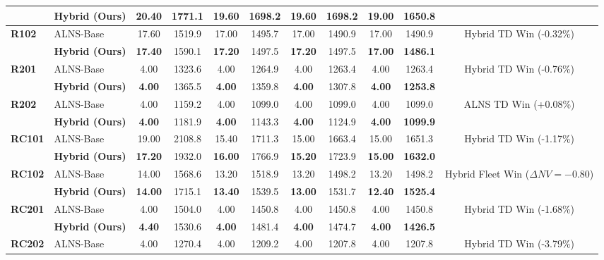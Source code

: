 \begin{table}[!htbp]
\begin{tabular*}{\textwidth}{@{\extracolsep{\fill}} ll cccccc cc c @{}}
 & \textbf{Hybrid (Ours)} & \textbf{20.40} & 1771.1 & \textbf{19.60} & 1698.2 & \textbf{19.60} & 1698.2 & \textbf{19.00} & \textbf{1650.8} & \\
\midrule
\multirow{2}{*}{\textbf{R102}} & ALNS-Base & 17.60 & 1519.9 & 17.00 & 1495.7 & 17.00 & 1490.9 & 17.00 & 1490.9 & \multirow{2}{*}{Hybrid TD Win (-0.32\%)} \\
 & \textbf{Hybrid (Ours)} & \textbf{17.40} & 1590.1 & \textbf{17.20} & 1497.5 & \textbf{17.20} & 1497.5 & \textbf{17.00} & \textbf{1486.1} & \\
\midrule
\multirow{2}{*}{\textbf{R201}} & ALNS-Base & 4.00 & 1323.6 & 4.00 & 1264.9 & 4.00 & 1263.4 & 4.00 & 1263.4 & \multirow{2}{*}{Hybrid TD Win (-0.76\%)} \\
 & \textbf{Hybrid (Ours)} & \textbf{4.00} & 1365.5 & \textbf{4.00} & 1359.8 & \textbf{4.00} & 1307.8 & \textbf{4.00} & \textbf{1253.8} & \\
\midrule
\multirow{2}{*}{\textbf{R202}} & ALNS-Base & 4.00 & 1159.2 & 4.00 & 1099.0 & 4.00 & 1099.0 & 4.00 & 1099.0 & \multirow{2}{*}{ALNS TD Win (+0.08\%)} \\
 & \textbf{Hybrid (Ours)} & \textbf{4.00} & 1181.9 & \textbf{4.00} & 1143.3 & \textbf{4.00} & 1124.9 & \textbf{4.00} & \textbf{1099.9} & \\
\midrule
\multirow{2}{*}{\textbf{RC101}} & ALNS-Base & 19.00 & 2108.8 & 15.40 & 1711.3 & 15.00 & 1663.4 & 15.00 & 1651.3 & \multirow{2}{*}{Hybrid TD Win (-1.17\%)} \\
 & \textbf{Hybrid (Ours)} & \textbf{17.20} & 1932.0 & \textbf{16.00} & 1766.9 & \textbf{15.20} & 1723.9 & \textbf{15.00} & \textbf{1632.0} & \\
\midrule
\multirow{2}{*}{\textbf{RC102}} & ALNS-Base & 14.00 & 1568.6 & 13.20 & 1518.9 & 13.20 & 1498.2 & 13.20 & 1498.2 & \multirow{2}{*}{Hybrid Fleet Win ($\Delta NV=-0.80$)} \\
 & \textbf{Hybrid (Ours)} & \textbf{14.00} & 1715.1 & \textbf{13.40} & 1539.5 & \textbf{13.00} & 1531.7 & \textbf{12.40} & \textbf{1525.4} & \\
\midrule
\multirow{2}{*}{\textbf{RC201}} & ALNS-Base & 4.00 & 1504.0 & 4.00 & 1450.8 & 4.00 & 1450.8 & 4.00 & 1450.8 & \multirow{2}{*}{Hybrid TD Win (-1.68\%)} \\
 & \textbf{Hybrid (Ours)} & \textbf{4.40} & 1530.6 & \textbf{4.00} & 1481.4 & \textbf{4.00} & 1474.7 & \textbf{4.00} & \textbf{1426.5} & \\
\midrule
\multirow{2}{*}{\textbf{RC202}} & ALNS-Base & 4.00 & 1270.4 & 4.00 & 1209.2 & 4.00 & 1207.8 & 4.00 & 1207.8 & \multirow{2}{*}{Hybrid TD Win (-3.79\%)} \\

\end{tabular*}
\end{table}
